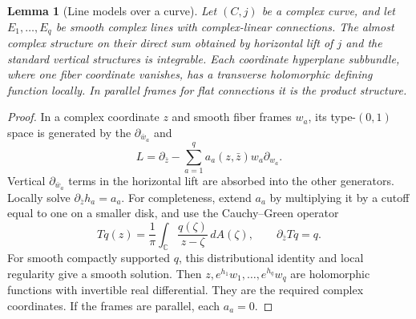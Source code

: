 \documentclass[11pt]{article}
\newtheorem{lemma}[theorem]{Lemma}
\theoremstyle{definition}
\theoremstyle{remark}
\newcommand{\C}{\mathbb C}
\begin{document}
\begin{lemma}[Line models over a curve]\label{lem:curve}
Let $(C,j)$ be a complex curve, and let $E_1,\ldots,E_q$ be smooth complex lines with complex-linear connections. The almost complex structure on their direct sum obtained by horizontal lift of $j$ and the standard vertical structures is integrable. Each coordinate hyperplane subbundle, where one fiber coordinate vanishes, has a transverse holomorphic defining function locally. In parallel frames for flat connections it is the product structure.
\end{lemma}
\begin{proof}
In a complex coordinate $z$ and smooth fiber frames $w_a$, its type-$(0,1)$ space is generated by the $\partial_{\bar w_a}$ and
\[
 L=\partial_{\bar z}-\sum_{a=1}^q a_a(z,\bar z)w_a\partial_{w_a}.
\]
Vertical $\partial_{\bar w_a}$ terms in the horizontal lift are absorbed into the other generators. Locally solve $\partial_{\bar z}h_a=a_a$. For completeness, extend $a_a$ by multiplying it by a cutoff equal to one on a smaller disk, and use the Cauchy--Green operator
\[
 Tq(z)=\frac1\pi\int_\C\frac{q(\zeta)}{z-\zeta}\,dA(\zeta),
 \qquad \partial_{\bar z}Tq=q.
\]
For smooth compactly supported $q$, this distributional identity and local regularity give a smooth solution. Then $z,e^{h_1}w_1,\ldots,e^{h_q}w_q$ are holomorphic functions with invertible real differential. They are the required complex coordinates. If the frames are parallel, each $a_a=0$.
\end{proof}
\end{document}
